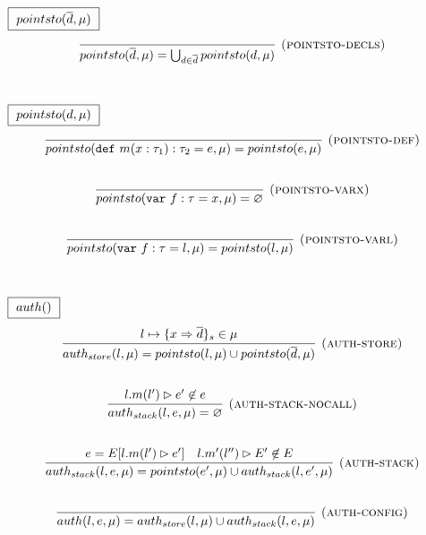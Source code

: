 \documentclass{llncs}
\newcommand{\keywadj}[1]{\mathtt{#1}}
\newcommand{\keyw}[1]{\keywadj{#1}~}
\begin{document}
$\fbox{$~pointsto(\overline{d}, \mu)~$}$
\[
\begin{array}{c}
\infer[\textsc{(pointsto-decls)}]
  {pointsto(\overline{d}, \mu) = \bigcup_{d \in \overline{d}} pointsto(d, \mu)}
  {}\\[5ex]
  
\end{array}
\]

$\fbox{$~pointsto(d, \mu)~$}$
\[
\begin{array}{c}

\infer[\textsc{(pointsto-def)}]
  {pointsto(\keyw{def} m(x : \tau_1) : \tau_2 = e, \mu) = pointsto(e, \mu)}
  {}\\[5ex]
  
\infer[\textsc{(pointsto-varx)}]
  {pointsto(\keyw{var} f:\tau = x,\mu) = \varnothing}
  {}\\[5ex]
\infer[\textsc{(pointsto-varl)}]
  {pointsto(\keyw{var} f:\tau = l,\mu) = pointsto(l,\mu)}
  {}\\[5ex]

\end{array}
\]

$\fbox{$~auth()~$}$
\[
\begin{array}{c}
\infer[\textsc{(auth-store)}]
  {auth_{store}(l,\mu) = pointsto(l, \mu) \cup pointsto(\overline{d},\mu)}
  {l \mapsto \{ x \Rightarrow \overline{d} \}_{s} \in \mu}\\[5ex]

\infer[\textsc{(auth-stack-nocall)}]
  {auth_{stack}(l, e, \mu) = \varnothing}
  {l.m(l') \rhd e' \not\in e}\\[5ex]
\infer[\textsc{(auth-stack)}]
  {auth_{stack}(l, e, \mu) = pointsto(e',\mu) \cup auth_{stack}(l,e',\mu)}
  {e = E[l.m(l') \rhd e'] & l.m'(l'') \rhd E' \not\in E}\\[5ex]
  
\infer[\textsc{(auth-config)}]
  {auth(l,e, \mu) = auth_{store}(l,\mu) \cup auth_{stack}(l,e,\mu)}
  {}\\[5ex]

\end{array}
\]
\end{document}
